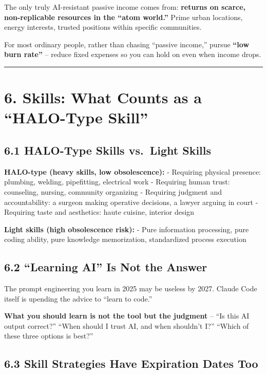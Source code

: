The only truly AI-resistant passive income comes from: \textbf{returns
on scarce, non-replicable resources in the ``atom world.''} Prime urban
locations, energy interests, trusted positions within specific
communities.

For most ordinary people, rather than chasing ``passive income,'' pursue
\textbf{``low burn rate''} -- reduce fixed expenses so you can hold on
even when income drops.

\begin{center}\rule{0.5\linewidth}{0.5pt}\end{center}

\section{6. Skills: What Counts as a ``HALO-Type
Skill''}\label{skills-what-counts-as-a-halo-type-skill}

\subsection{6.1 HALO-Type Skills vs.~Light
Skills}\label{halo-type-skills-vs.-light-skills}

\textbf{HALO-type (heavy skills, low obsolescence):} - Requiring
physical presence: plumbing, welding, pipefitting, electrical work -
Requiring human trust: counseling, nursing, community organizing -
Requiring judgment and accountability: a surgeon making operative
decisions, a lawyer arguing in court - Requiring taste and aesthetics:
haute cuisine, interior design

\textbf{Light skills (high obsolescence risk):} - Pure information
processing, pure coding ability, pure knowledge memorization,
standardized process execution

\subsection{6.2 ``Learning AI'' Is Not the
Answer}\label{learning-ai-is-not-the-answer}

The prompt engineering you learn in 2025 may be useless by 2027. Claude
Code itself is upending the advice to ``learn to code.''

\textbf{What you should learn is not the tool but the judgment} -- ``Is
this AI output correct?'' ``When should I trust AI, and when shouldn't
I?'' ``Which of these three options is best?''

\subsection{6.3 Skill Strategies Have Expiration Dates
Too}\label{skill-strategies-have-expiration-dates-too}


